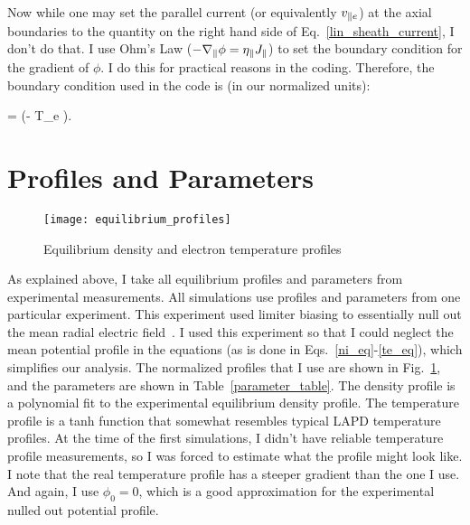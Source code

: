 Now while one may set the parallel current (or equivalently $v_{\parallel e}$) at the axial boundaries to the quantity on the right hand side of Eq.~\ref{lin_sheath_current}, I don't do that.
I use Ohm's Law ($- \nabla_\parallel \phi = \eta_\parallel J_\parallel$) to set the boundary condition for the gradient of $\phi$. I do this for practical reasons in the coding. Therefore, the
boundary condition used in the code is (in our normalized units):

\beq
\label{sheath_bc}
\gradpar \phi = \pm {} \left(\phi - \Lambda T_e  \right).
\eeq



\section{Profiles and Parameters}
\label{s_profs_params}

\begin{figure}[!ht]
\texttt{[image: equilibrium\_profiles]}
\centering
\caption{Equilibrium density and electron temperature profiles}
\label{equilibrium_profiles}
\end{figure}


As explained above, I take all equilibrium profiles and parameters from experimental measurements. 
All simulations use profiles and parameters from one particular experiment.
This experiment used limiter biasing to essentially null out the mean radial electric field~\cite{schaffner2012}. I used this experiment so that I could neglect the mean potential profile
in the equations (as is done in Eqs.~\ref{ni_eq}-\ref{te_eq}), which simplifies our analysis. The normalized profiles that I use are shown in Fig.~\ref{equilibrium_profiles}, and the parameters
are shown in Table~\ref{parameter_table}. The density profile is
a polynomial fit to the experimental equilibrium density profile. The temperature profile is a tanh function that somewhat resembles typical LAPD temperature profiles. At the time of the first
simulations, I didn't have reliable temperature profile measurements, so I was forced to estimate what the profile might look like. I note that the real temperature profile has a steeper
gradient than the one I use. And again, I use $\phi_0 = 0$, which is a good approximation for the experimental nulled out potential profile.


